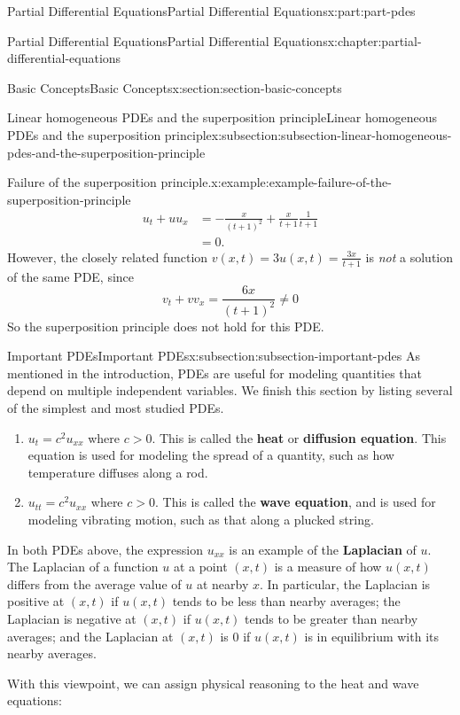 \documentclass[oneside,10pt,]{book}
\newcommand{\terminology}[1]{\textbf{#1}}
\numberwithin{equation}{part}
\newcommand{\gt}{>}
\newcommand{\amp}{&}
\begin{document}
\begin{partptx}{Partial Differential Equations}{}{Partial Differential Equations}{}{}{x:part:part-pdes}
\begin{chapterptx}{Partial Differential Equations}{}{Partial Differential Equations}{}{}{x:chapter:partial-differential-equations}
\begin{sectionptx}{Basic Concepts}{}{Basic Concepts}{}{}{x:section:section-basic-concepts}
\begin{subsectionptx}{Linear homogeneous PDEs and the superposition principle}{}{Linear homogeneous PDEs and the superposition principle}{}{}{x:subsection:subsection-linear-homogeneous-pdes-and-the-superposition-principle}
\begin{example}{Failure of the superposition principle.}{x:example:example-failure-of-the-superposition-principle}
\begin{align*}
u_{t} + uu_{x} \amp = -\frac{x}{(t+1)^{2}} + \frac{x}{t+1}\frac{1}{t+1} \\
\amp = 0 \text{.}
\end{align*}
However, the closely related function \(v(x,t) = 3u(x,t) = \frac{3x}{t+1}\) is \emph{not} a solution of the same PDE, since%
\begin{equation*}
v_{t}+vv_{x} = \frac{6x}{(t+1)^{2}}\neq0
\end{equation*}
So the superposition principle does not hold for this PDE.%
\end{example}
\end{subsectionptx}
%
%
\typeout{************************************************}
\typeout{************************************************}
%
\begin{subsectionptx}{Important PDEs}{}{Important PDEs}{}{}{x:subsection:subsection-important-pdes}
As mentioned in the introduction, PDEs are useful for modeling quantities that depend on multiple independent variables. We finish this section by listing several of the simplest and most studied PDEs.%
%
\begin{enumerate}
\item{}\(u_{t} = c^{2}u_{xx}\) where \(c\gt0\). This is called the \terminology{heat} or \terminology{diffusion equation}. This equation is used for modeling the spread of a quantity, such as how temperature diffuses along a rod.%
\item{}\(u_{tt} = c^{2}u_{xx}\) where \(c\gt0\). This is called the \terminology{wave equation}, and is used for modeling vibrating motion, such as that along a plucked string.%
\end{enumerate}
In both PDEs above, the expression \(u_{xx}\) is an example of the \terminology{Laplacian} of \(u\). The Laplacian of a function \(u\) at a point \((x,t)\) is a measure of how \(u(x,t)\) differs from the average value of \(u\) at nearby \(x\). In particular, the Laplacian is positive at \((x,t)\) if \(u(x,t)\) tends to be less than nearby averages; the Laplacian is negative at \((x,t)\) if \(u(x,t)\) tends to be greater than nearby averages; and the Laplacian at \((x,t)\) is \(0\) if \(u(x,t)\) is in equilibrium with its nearby averages.%
\par
With this viewpoint, we can assign physical reasoning to the heat and wave equations:%
\begin{enumerate}

\end{enumerate}
\end{subsectionptx}
\end{sectionptx}
\end{chapterptx}
\end{partptx}
\end{document}
